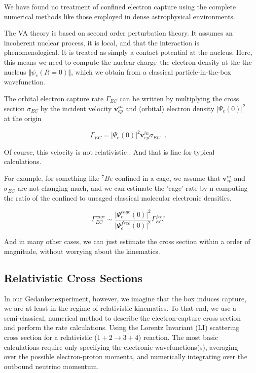 \documentclass[%
 aip,
 jmp,%
 amsmath,amssymb,
 reprint,%
]{revtex4-1}
\begin{document}
We have found no treatment of confined electron capture using the complete numerical methods like those employed in dense astrophysical environments.

The VA theory is based on second order perturbation theory.  It assumes an incoherent nuclear process, it is local, and that the interaction is phenomenological. It is treated as simply a contact potential at the nucleus. Here, this means we need to compute the nuclear charge--the electron density at the the nucleus $\Vert\psi_{e}(R=0)\Vert$, which we obtain from a classical particle-in-the-box wavefunction.

The orbital electron capture rate $\Gamma_{EC}$  can be written by multiplying the cross section $\sigma_{EC}$ by the incident velocity $\mathbf{v}^{in}_{ep}$ and (orbital) electron density $\big\vert\Psi_{e}(0)\big\vert^{2}$  at the origin

$$\Gamma_{EC}=\big\vert\Psi_{e}(0)\big\vert^{2}\mathbf{v}^{in}_{ep}\sigma_{EC}\;\;.$$

Of course, this velocity is not relativistic \cite{Cannoni}.  And that is fine for typical calculations.

For example, for something like  $^7Be$ confined in a cage, we assume that $\mathbf{v}^{in}_{ep}$ and $\sigma_{EC}$ are not changing much, and we can estimate the 'cage' rate by n computing the ratio of the confined to uncaged classical molecular electronic densities. 

$$\Gamma^{cage}_{EC}\sim\dfrac{\vert\Psi^{cage}_{e}(0)\vert^{2}}{\vert\Psi^{free}_{e}(0)\vert^{2}}\Gamma^{free}_{EC}$$

And in many other cases, we can just estimate the cross section within a order of magnitude, without worrying about the kinematics.

\subsection{Relativistic Cross Sections}

In our Gedankenexperiment, however, we imagine that the box induces capture, we are at least in the regime of relativistic kinematics.  To that end,
we use a semi-classical, numerical method to describe the electron-capture cross section and perform the rate calculations. Using the Lorentz Invariant (LI) scattering cross section for a relativistic ($1+2\rightarrow 3+4$) reaction.  The most basic calculations require only specifying the electronic wavefunctions(s), averaging over the possible electron-proton momenta, and numerically integrating over the outbound neutrino momentum.    
\end{document}
